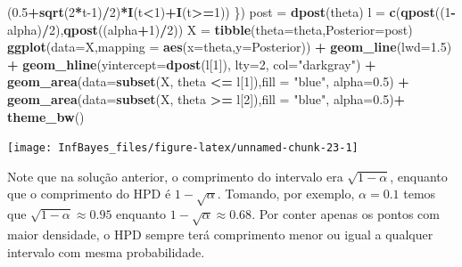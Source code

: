 \documentclass[
]{book}
\newenvironment{Shaded}{\begin{snugshade}}{\end{snugshade}}
\newcommand{\DataTypeTok}[1]{\textcolor[rgb]{0.13,0.29,0.53}{#1}}
\newcommand{\DecValTok}[1]{\textcolor[rgb]{0.00,0.00,0.81}{#1}}
\newcommand{\FloatTok}[1]{\textcolor[rgb]{0.00,0.00,0.81}{#1}}
\newcommand{\KeywordTok}[1]{\textcolor[rgb]{0.13,0.29,0.53}{\textbf{#1}}}
\newcommand{\NormalTok}[1]{#1}
\newcommand{\OperatorTok}[1]{\textcolor[rgb]{0.81,0.36,0.00}{\textbf{#1}}}
\newcommand{\StringTok}[1]{\textcolor[rgb]{0.31,0.60,0.02}{#1}}
\begin{document}
\begin{Shaded}
\begin{Highlighting}[]
\NormalTok{    (}\FloatTok{0.5}\OperatorTok{+}\KeywordTok{sqrt}\NormalTok{(}\DecValTok{2}\OperatorTok{*}\NormalTok{t}\DecValTok{-1}\NormalTok{)}\OperatorTok{/}\DecValTok{2}\NormalTok{)}\OperatorTok{*}\KeywordTok{I}\NormalTok{(t}\OperatorTok{<}\DecValTok{1}\NormalTok{)}\OperatorTok{+}\KeywordTok{I}\NormalTok{(t}\OperatorTok{>=}\DecValTok{1}\NormalTok{)) \})}
\NormalTok{post =}\StringTok{ }\KeywordTok{dpost}\NormalTok{(theta)}
\NormalTok{l =}\StringTok{ }\KeywordTok{c}\NormalTok{(}\KeywordTok{qpost}\NormalTok{((}\DecValTok{1}\OperatorTok{-}\NormalTok{alpha)}\OperatorTok{/}\DecValTok{2}\NormalTok{),}\KeywordTok{qpost}\NormalTok{((alpha}\OperatorTok{+}\DecValTok{1}\NormalTok{)}\OperatorTok{/}\DecValTok{2}\NormalTok{))}
\NormalTok{X =}\StringTok{ }\KeywordTok{tibble}\NormalTok{(}\DataTypeTok{theta=}\NormalTok{theta,}\DataTypeTok{Posterior=}\NormalTok{post)}
\KeywordTok{ggplot}\NormalTok{(}\DataTypeTok{data=}\NormalTok{X,}\DataTypeTok{mapping =} \KeywordTok{aes}\NormalTok{(}\DataTypeTok{x=}\NormalTok{theta,}\DataTypeTok{y=}\NormalTok{Posterior)) }\OperatorTok{+}
\StringTok{  }\KeywordTok{geom_line}\NormalTok{(}\DataTypeTok{lwd=}\FloatTok{1.5}\NormalTok{) }\OperatorTok{+}
\StringTok{  }\KeywordTok{geom_hline}\NormalTok{(}\DataTypeTok{yintercept=}\KeywordTok{dpost}\NormalTok{(l[}\DecValTok{1}\NormalTok{]), }\DataTypeTok{lty=}\DecValTok{2}\NormalTok{, }\DataTypeTok{col=}\StringTok{"darkgray"}\NormalTok{) }\OperatorTok{+}
\StringTok{  }\KeywordTok{geom_area}\NormalTok{(}\DataTypeTok{data=}\KeywordTok{subset}\NormalTok{(X, theta }\OperatorTok{<=}\StringTok{ }\NormalTok{l[}\DecValTok{1}\NormalTok{]),}\DataTypeTok{fill =} \StringTok{"blue"}\NormalTok{, }\DataTypeTok{alpha=}\FloatTok{0.5}\NormalTok{) }\OperatorTok{+}
\StringTok{  }\KeywordTok{geom_area}\NormalTok{(}\DataTypeTok{data=}\KeywordTok{subset}\NormalTok{(X, theta }\OperatorTok{>=}\StringTok{ }\NormalTok{l[}\DecValTok{2}\NormalTok{]),}\DataTypeTok{fill =} \StringTok{"blue"}\NormalTok{, }\DataTypeTok{alpha=}\FloatTok{0.5}\NormalTok{)}\OperatorTok{+}
\StringTok{  }\KeywordTok{theme_bw}\NormalTok{()}
\end{Highlighting}
\end{Shaded}

\begin{center}\texttt{[image: InfBayes\_files/figure-latex/unnamed-chunk-23-1]} \end{center}

Note que na solução anterior, o comprimento do intervalo era \(\sqrt{1-\alpha}\), enquanto que o comprimento do HPD é \(1-\sqrt{\alpha}\). Tomando, por exemplo, \(\alpha=0.1\) temos que \(\sqrt{1-\alpha} \approx 0.95\) enquanto \(1-\sqrt{\alpha}\approx 0.68\). Por conter apenas os pontos com maior densidade, o HPD sempre terá comprimento menor ou igual a qualquer intervalo com mesma probabilidade.
\end{document}
